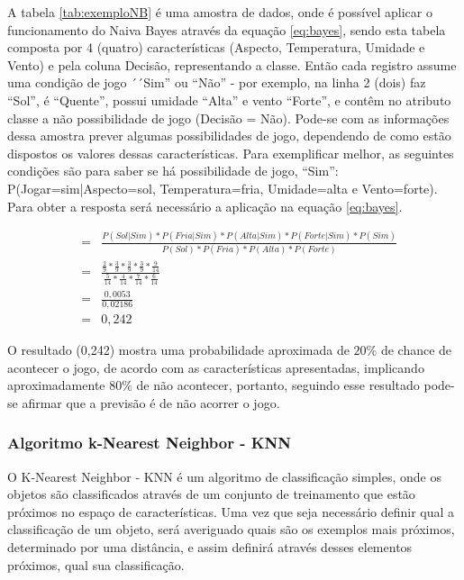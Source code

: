 A tabela \ref{tab:exemploNB} é uma amostra de dados, onde é possível aplicar o funcionamento do Naiva Bayes através da equação \ref{eq:bayes}, sendo esta tabela composta por 4 (quatro) características (Aspecto, Temperatura, Umidade e Vento) e pela coluna Decisão, representando a classe. Então cada registro assume uma condição de jogo ´´Sim'' ou ``Não'' - por exemplo, na linha 2 (dois) faz ``Sol'', é ``Quente'', possui umidade ``Alta'' e vento ``Forte'', e contêm no atributo classe a não possibilidade de jogo (Decisão = Não). Pode-se com as informações dessa amostra prever algumas possibilidades de jogo, dependendo de como estão dispostos os valores dessas características. Para exemplificar melhor, as seguintes condições  são para saber se há possibilidade de jogo, ``Sim'': P(Jogar=sim|Aspecto=sol, Temperatura=fria, Umidade=alta e Vento=forte). Para obter a resposta será necessário a aplicação na equação \ref{eq:bayes}.  


\begin{eqnarray}
&=& \frac{ P(Sol|Sim)*P(Fria|Sim)*P(Alta|Sim)*P(Forte|Sim)*P(Sim) }{ P(Sol)*P(Fria)*P(Alta)*P(Forte) } \nonumber \\
 &=& \frac{ \frac{2}{9}*\frac{3}{9}*\frac{3}{9}*\frac{3}{9}*\frac{9}{14} }{ \frac{5}{14}*\frac{4}{14}*\frac{7}{14}*\frac{6}{14} } \nonumber \\
 &=& \frac{0,0053}{0,02186} \nonumber \\
 &=& 0,242
 \label{eq:resolNB}
\end{eqnarray}

O resultado (0,242) mostra uma probabilidade aproximada de ${20\%}$ de chance de acontecer o jogo, de acordo com as características apresentadas, implicando aproximadamente  ${80\%}$ de não acontecer, portanto, seguindo esse resultado pode-se afirmar que a previsão é de não acorrer o jogo.

\subsubsection{Algoritmo k-Nearest Neighbor - KNN}\label{cap:refTeor:sssec:knn}

O K-Nearest Neighbor - KNN é um algoritmo de classificação simples, onde os objetos são classificados através de um conjunto de treinamento que estão próximos no espaço de características. Uma vez que seja necessário definir qual a classificação de um objeto, será averiguado quais são os exemplos mais próximos, determinado por uma distância, e assim definirá através desses elementos próximos, qual sua classificação. 

